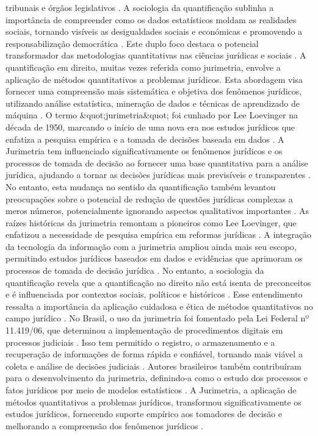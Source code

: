 tribunais e órgãos legislativos \cite{nunes2018}. A sociologia da quantificação sublinha a importância de compreender como os dados estatísticos moldam as realidades sociais, tornando visíveis as desigualdades sociais e económicas e promovendo a responsabilização democrática \cite{saltelli2020,demortain2019}. Este duplo foco destaca o potencial transformador das metodologias quantitativas nas ciências jurídicas e sociais \cite{paiva2021,camargo2021}. A quantificação em direito, muitas vezes referida como jurimetria, envolve a aplicação de métodos quantitativos a problemas jurídicos. Esta abordagem visa fornecer uma compreensão mais sistemática e objetiva dos fenômenos jurídicos, utilizando análise estatística, mineração de dados e técnicas de aprendizado de máquina \cite{1023071190721}. O termo &quot;jurimetria&quot; foi cunhado por Lee Loevinger na década de 1950, marcando o início de uma nova era nos estudos jurídicos que enfatiza a pesquisa empírica e a tomada de decisões baseada em dados \cite{1023071190721}. A Jurimetria tem influenciado significativamente os fenômenos jurídicos e os processos de tomada de decisão ao fornecer uma base quantitativa para a análise jurídica, ajudando a tornar as decisões jurídicas mais previsíveis e transparentes \cite{ribeiro2021quantification}. No entanto, esta mudança no sentido da quantificação também levantou preocupações sobre o potencial de redução de questões jurídicas complexas a meros números, potencialmente ignorando aspectos qualitativos importantes \cite{ribeiro2021quantification}. As raízes históricas da jurimetria remontam a pioneiros como Lee Loevinger, que enfatizou a necessidade de pesquisa empírica em reformas jurídicas \cite{1023071190721}. A integração da tecnologia da informação com a jurimetria ampliou ainda mais seu escopo, permitindo estudos jurídicos baseados em dados e evidências que aprimoram os processos de tomada de decisão jurídica \cite{10.1007/s11186-021-09453-1,unger2021process}. No entanto, a sociologia da quantificação revela que a quantificação no direito não está isenta de preconceitos e é influenciada por contextos sociais, políticos e históricos \cite{10.1590/dados.2022.65.3.267,10.1007/978-3-319-44000-215} . Esse entendimento ressalta a importância da aplicação cuidadosa e ética de métodos quantitativos no campo jurídico \cite{smith2021}. No Brasil, o uso da jurimetria foi fomentado pela Lei Federal nº 11.419/06, que determinou a implementação de procedimentos digitais em processos judiciais \cite{103390fi9040068}. Isso tem permitido o registro, o armazenamento e a recuperação de informações de forma rápida e confiável, tornando mais viável a coleta e análise de decisões judiciais \cite{103390fi9040068}. Autores brasileiros também contribuíram para o desenvolvimento da jurimetria, definindo-a como o estudo dos processos e fatos jurídicos por meio de modelos estatísticos \cite{silva2023role}. A Jurimetria, a aplicação de métodos quantitativos a problemas jurídicos, transformou significativamente os estudos jurídicos, fornecendo suporte empírico aos tomadores de decisão e melhorando a compreensão dos fenômenos jurídicos \cite{103390fi9040068}. 


